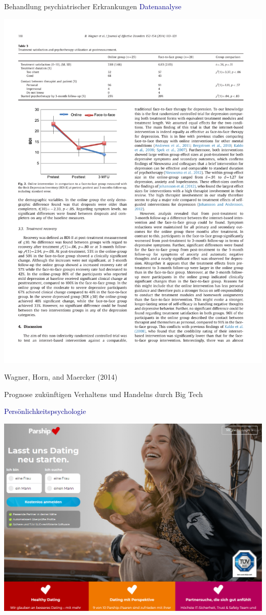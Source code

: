 \documentclass[
  8pt,
  ignorenonframetext,
]{beamer}
\begin{document}
\begin{frame}{Behandlung psychiatrischer Erkrankungen}
\protect\hypertarget{behandlung-psychiatrischer-erkrankungen-4}{}
\textcolor{darkblue}{Datenanalyse}

\begin{center}\includegraphics[width=0.75\linewidth]{2_Abbildungen/pfm_2_wagner_datenanalyse} \end{center}
\flushright
\footnotesize

Wagner, Horn, and Maercker (2014)
\end{frame}

\begin{frame}{Prognose zukünftigen Verhaltens und Handelns durch Big
Tech}
\protect\hypertarget{prognose-zukuxfcnftigen-verhaltens-und-handelns-durch-big-tech}{}
\vfill

\textcolor{darkblue}{Persönlichkeitspsychologie} \vspace{2mm}

\begin{center}\includegraphics[width=0.75\linewidth]{2_Abbildungen/pfm_2_bigtech_parship} \end{center}
\vfill
\end{frame}
\end{document}
